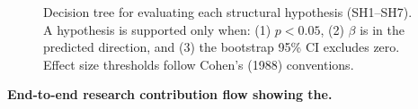 \begin{figure}[!htbp]
{%
}%
\caption[Hypothesis Testing Decision Tree]{Decision tree for evaluating each structural hypothesis (SH1--SH7). A hypothesis is supported only when: (1) $p < 0.05$, (2) $\beta$ is in the predicted direction, and (3) the bootstrap 95\% CI excludes zero. Effect size thresholds follow Cohen's (1988) conventions.}
\label{fig:rgaig_hypothesis_decision_tree_theory}
\end{figure}

\noindent\textbf{End-to-end research contribution flow showing the.}

